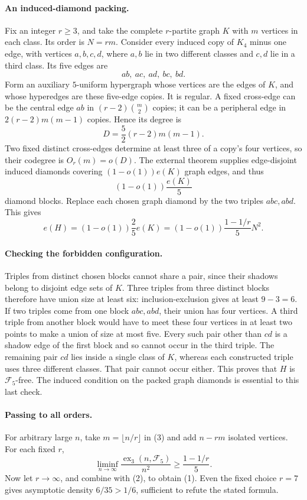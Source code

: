 \paragraph{An induced-diamond packing.}
Fix an integer \(r\geq3\), and take the complete \(r\)-partite graph \(K\) with \(m\) vertices in each class. Its order is \(N=rm\). Consider every induced copy of \(K_4\) minus one edge, with vertices \(a,b,c,d\), where \(a,b\) lie in two different classes and \(c,d\) lie in a third class. Its five edges are
\[
 ab,\ ac,\ ad,\ bc,\ bd.
\]
Form an auxiliary \(5\)-uniform hypergraph whose vertices are the edges of \(K\), and whose hyperedges are these five-edge copies.
It is regular. A fixed cross-edge can be the central edge \(ab\) in
\((r-2)\binom m2\) copies; it can be a peripheral edge in
\(2(r-2)m(m-1)\) copies. Hence its degree is
\[
 D=\frac52(r-2)m(m-1).
\]
Two fixed distinct cross-edges determine at least three of a copy's four vertices, so their codegree is \(O_r(m)=o(D)\). The external theorem supplies edge-disjoint induced diamonds covering \((1-o(1))e(K)\) graph edges, and thus
\[
 (1-o(1))\frac{e(K)}5
\]
diamond blocks.
Replace each chosen graph diamond by the two triples \(abc,abd\). This gives
\[
 e(H)=(1-o(1))\frac25 e(K)
 =\left(1-o(1)\right)\frac{1-1/r}{5}N^2.
 \tag{3}
\]

\paragraph{Checking the forbidden configuration.}
Triples from distinct chosen blocks cannot share a pair, since their shadows belong to disjoint edge sets of \(K\). Three triples from three distinct blocks therefore have union size at least six: inclusion-exclusion gives at least \(9-3=6\).
If two triples come from one block \(abc,abd\), their union has four vertices. A third triple from another block would have to meet these four vertices in at least two points to make a union of size at most five. Every such pair other than \(cd\) is a shadow edge of the first block and so cannot occur in the third triple. The remaining pair \(cd\) lies inside a single class of \(K\), whereas each constructed triple uses three different classes. That pair cannot occur either. This proves that \(H\) is \(\mathcal F_5\)-free.
The induced condition on the packed graph diamonds is essential to this last check.

\paragraph{Passing to all orders.}
For arbitrary large \(n\), take \(m=\lfloor n/r\rfloor\) in (3) and add \(n-rm\) isolated vertices. For each fixed \(r\),
\[
 \liminf_{n\to\infty}
 \frac{\operatorname{ex}_3(n,\mathcal F_5)}{n^2}
 \geq\frac{1-1/r}{5}.
\]
Now let \(r\to\infty\), and combine with (2), to obtain (1). Even the fixed choice \(r=7\) gives asymptotic density \(6/35>1/6\), sufficient to refute the stated formula.

